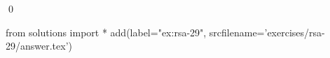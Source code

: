
\begin{ex} 
  \label{ex:rsa-29}
  
  \qed
\end{ex} 
\begin{python0}
from solutions import *
add(label="ex:rsa-29",
    srcfilename='exercises/rsa-29/answer.tex') 
\end{python0}
